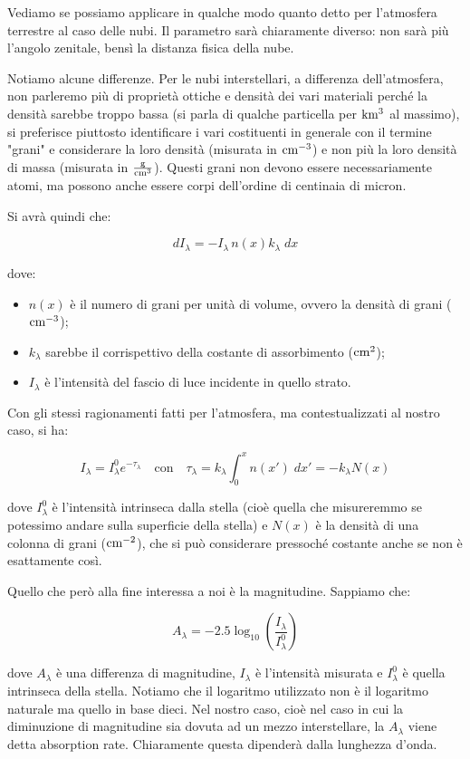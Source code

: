 \vspace{0.3cm}Vediamo se possiamo applicare in qualche modo quanto detto per l'atmosfera terrestre al caso delle nubi. Il parametro sarà chiaramente diverso: non sarà più l'angolo zenitale, bensì la distanza fisica della nube.

Notiamo alcune differenze. Per le nubi interstellari, a differenza dell'atmosfera, non parleremo più di proprietà ottiche e densità dei vari materiali perché la densità sarebbe troppo bassa (si parla di qualche particella per $\rm km^3$ al massimo), si preferisce piuttosto identificare i vari costituenti in generale con il termine "grani" e considerare la loro densità (misurata in $\rm cm^{-3}$) e non più la loro densità di massa (misurata in $\rm \frac{g}{cm^3}$). Questi grani non devono essere necessariamente atomi, ma possono anche essere corpi dell'ordine di centinaia di micron.

Si avrà quindi che:

$$dI_{\lambda}=-I_{\lambda} \, n(x) k_{\lambda} \; dx$$

dove:

\begin{itemize}
   \item $n(x)$ è il numero di grani per unità di volume, ovvero la densità di grani ($\rm cm^{-3}$);
   \item $k_{\lambda}$ sarebbe il corrispettivo della costante di assorbimento ($\rm cm^2$);
   \item $I_{\lambda}$ è l'intensità del fascio di luce incidente in quello strato.
\end{itemize}

Con gli stessi ragionamenti fatti per l'atmosfera, ma contestualizzati al nostro caso, si ha:

$$I_{\lambda}=I_{\lambda}^0 e^{-\tau_{\lambda}}
\quad\text{con}\quad
\tau_{\lambda}=k_{\lambda} \int_0^x n(x') \; dx'=-k_{\lambda} N(x)$$

dove $I_{\lambda}^0$ è l'intensità intrinseca dalla stella (cioè quella che misureremmo se potessimo andare sulla superficie della stella) e $N(x)$ è la densità di una colonna di grani ($\rm cm^{-2}$), che si può considerare pressoché costante anche se non è esattamente così.

Quello che però alla fine interessa a noi è la magnitudine. Sappiamo che: 

$$A_{\lambda} = -2.5 \log_{10} \left( \frac{I_{\lambda}}{I_{\lambda}^0 } \right)$$

dove $A_{\lambda}$ è una differenza di magnitudine, $I_{\lambda}$ è l'intensità misurata e $I_{\lambda}^0$ è quella intrinseca della stella. Notiamo che il logaritmo utilizzato non è il logaritmo naturale ma quello in base dieci. Nel nostro caso, cioè nel caso in cui la diminuzione di magnitudine sia dovuta ad un mezzo interstellare, la $A_{\lambda}$ viene detta absorption rate. Chiaramente questa dipenderà dalla lunghezza d'onda.

